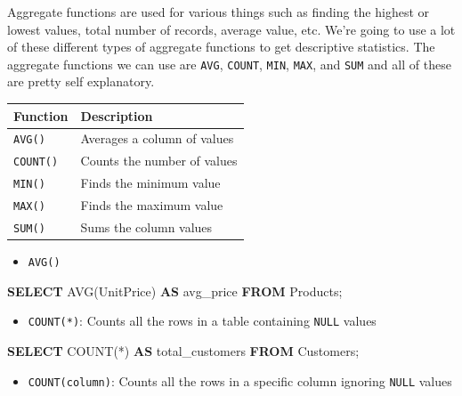 \documentclass[]{book}
\makeatletter
\newenvironment{Shaded}{\begin{snugshade}}{\end{snugshade}}
\newcommand{\KeywordTok}[1]{\textcolor[rgb]{0.13,0.29,0.53}{\textbf{{#1}}}}
\newcommand{\FunctionTok}[1]{\textcolor[rgb]{0.00,0.00,0.00}{{#1}}}
\newcommand{\NormalTok}[1]{{#1}}
\providecommand{\tightlist}{%
  \setlength{\itemsep}{0pt}\setlength{\parskip}{0pt}}
\newenvironment{kframe}{%
\medskip{}
\setlength{\fboxsep}{.8em}
 \def\at@end@of@kframe{}%
 \ifinner\ifhmode%
  \def\at@end@of@kframe{\end{minipage}}%
  \begin{minipage}{\columnwidth}%
 \fi\fi%
 \def\FrameCommand##1{\hskip\@totalleftmargin \hskip-\fboxsep
 \colorbox{shadecolor}{##1}\hskip-\fboxsep
     \hskip-\linewidth \hskip-\@totalleftmargin \hskip\columnwidth}%
 \MakeFramed {\advance\hsize-\width
   \@totalleftmargin\z@ \linewidth\hsize
   \@setminipage}}%
 {\par\unskip\endMakeFramed%
 \at@end@of@kframe}
\renewenvironment{Shaded}{\begin{kframe}}{\end{kframe}}
\theoremstyle{definition}
\theoremstyle{definition}
\theoremstyle{remark}
\makeatother
\begin{document}
Aggregate functions are used for various things such as finding the
highest or lowest values, total number of records, average value, etc.
We're going to use a lot of these different types of aggregate functions
to get descriptive statistics. The aggregate functions we can use are
\texttt{AVG}, \texttt{COUNT}, \texttt{MIN}, \texttt{MAX}, and
\texttt{SUM} and all of these are pretty self explanatory.

\begin{longtable}[]{@{}ll@{}}
\toprule
Function & Description\tabularnewline
\midrule
\endhead
\texttt{AVG()} & Averages a column of values\tabularnewline
\texttt{COUNT()} & Counts the number of values\tabularnewline
\texttt{MIN()} & Finds the minimum value\tabularnewline
\texttt{MAX()} & Finds the maximum value\tabularnewline
\texttt{SUM()} & Sums the column values\tabularnewline
\bottomrule
\end{longtable}

\begin{itemize}
\tightlist
\item
  \texttt{AVG()}
\end{itemize}

\begin{Shaded}
\begin{Highlighting}[]
\KeywordTok{SELECT} \FunctionTok{AVG}\NormalTok{(UnitPrice) }\KeywordTok{AS} \NormalTok{avg_price}
\KeywordTok{FROM} \NormalTok{Products;}
\end{Highlighting}
\end{Shaded}

\begin{itemize}
\tightlist
\item
  \texttt{COUNT(*)}: Counts all the rows in a table containing
  \texttt{NULL} values
\end{itemize}

\begin{Shaded}
\begin{Highlighting}[]
\KeywordTok{SELECT} \FunctionTok{COUNT}\NormalTok{(*) }\KeywordTok{AS} \NormalTok{total_customers}
\KeywordTok{FROM} \NormalTok{Customers;}
\end{Highlighting}
\end{Shaded}

\begin{itemize}
\tightlist
\item
  \texttt{COUNT(column)}: Counts all the rows in a specific column
  ignoring \texttt{NULL} values
\end{itemize}
\end{document}

